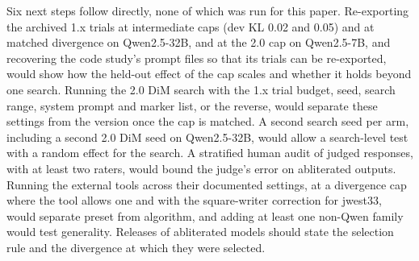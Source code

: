 Six next steps follow directly, none of which was run for this paper. Re-exporting the archived 1.x trials at
intermediate caps (dev KL 0.02 and 0.05) and at matched divergence on Qwen2.5-32B, and at the 2.0 cap on Qwen2.5-7B,
and recovering the code study's prompt files so that its trials can be re-exported, would show how the held-out effect
of the cap scales and whether it holds beyond one search. Running the 2.0 DiM search with the 1.x trial budget, seed,
search range, system prompt and marker list, or the reverse, would separate these settings from the version once the
cap is matched. A second search seed per arm, including a second 2.0 DiM seed on Qwen2.5-32B, would allow a
search-level test with a random effect for the search. A stratified human audit of judged responses, with at least two
raters, would bound the judge's error on abliterated outputs. Running the external tools across their documented
settings, at a divergence cap where the tool allows one and with the square-writer correction for jwest33, would
separate preset from algorithm, and adding at least one non-Qwen family would test generality. Releases of abliterated
models should state the selection rule and the divergence at which they were selected.
